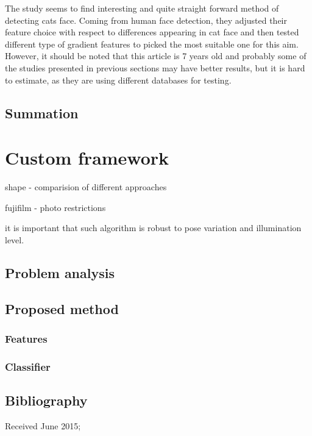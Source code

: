 \documentclass[hyperref]{acmtrans2e}
\begin{document}
The study seems to find interesting and quite straight forward method of detecting cats face. Coming from human face detection, they adjusted their feature choice with respect to differences appearing in cat face and then tested different type of gradient features to picked the most suitable one for this aim. However, it should be noted that this article is 7 years old and probably some of the studies presented in previous sections may have better results, but it is hard to estimate, as they are using different databases for testing.

\subsection{Summation}
\section{Custom framework}
shape - comparision of different approaches

fujifilm - photo restrictions

it is important that such algorithm is robust to pose variation and illumination level.
\subsection{Problem analysis}
\subsection{Proposed method}
\subsubsection{Features}
\subsubsection{Classifier}

\subsection{Bibliography}


\begin{received}
Received June 2015;
\end{received}
\end{document}
